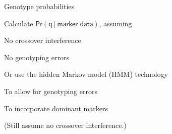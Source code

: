 \documentclass[aspectratio=169,12pt,t]{beamer}
\begin{document}
\begin{frame}{Genotype probabilities}



\bigskip

{\small
Calculate {\hilit $\mathsf{\text{Pr}(q \ | \ \text{marker data})}$}, assuming

\sbi
\item No crossover interference
\item No genotyping errors
\ei

\bigskip

Or use the {\hilit hidden Markov model (HMM)} technology

\sbi
\item To allow for genotyping errors
\item To incorporate dominant markers
\item {\hilit (Still assume no crossover interference.)}
\ei
}

\end{frame}
\end{document}
